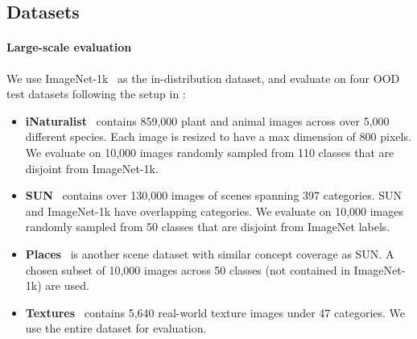 \documentclass{article}
\begin{document}
\subsection{Datasets}
\label{app:dataset}
\paragraph{Large-scale evaluation} We use ImageNet-1k~\cite{deng2009imagenet} as the in-distribution dataset, and evaluate on four OOD test datasets following the setup in \cite{huang2021mos}:
\begin{itemize}
    \item \textbf{iNaturalist}~\cite{van2018inaturalist} contains 859,000 plant and animal images across over 5,000 different species. Each image is resized to have a max dimension of 800 pixels. %
    We evaluate on 10,000 images randomly sampled from 110 classes that are disjoint from ImageNet-1k.
    \vspace{-0.1cm}
    \item \textbf{SUN}~\cite{xiao2010sun} contains over 130,000 images of scenes spanning 397 categories. SUN and ImageNet-1k have overlapping categories. %
    We evaluate on 10,000 images randomly sampled from 50 classes that are disjoint from ImageNet labels.
    \vspace{-0.1cm}
    \item \textbf{Places}~\cite{zhou2017places} is another scene dataset with similar concept coverage as SUN. A chosen subset of 10,000 images across 50 classes (not contained in ImageNet-1k) are used.
    \vspace{-0.1cm}
    \item \textbf{Textures}~\cite{cimpoi14describing} contains 5,640 real-world texture images under 47 categories. We use the entire dataset for evaluation.
\end{itemize}
\end{document}
